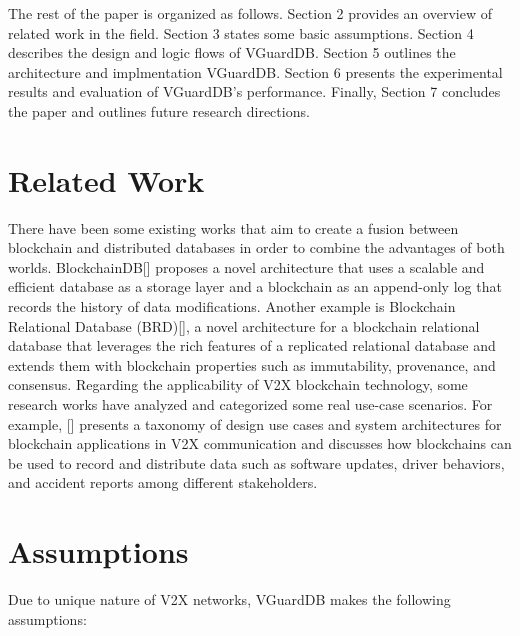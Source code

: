 The rest of the paper is organized as follows. Section 2 provides an overview of related work in the field. Section 3 states some basic assumptions. Section 4 describes the design and logic flows of VGuardDB. Section 5 outlines the architecture and implmentation VGuardDB. Section 6 presents the experimental results and evaluation of VGuardDB's performance. Finally, Section 7 concludes the paper and outlines future research directions.

\section{Related Work}
There have been some existing works that aim to create a fusion between blockchain and distributed databases in order to combine the advantages of both worlds. BlockchainDB[] proposes a novel architecture that uses a scalable and efficient database as a storage layer and a blockchain as an append-only log that records the history of data modifications. Another example is Blockchain Relational Database (BRD)[], a novel architecture for a blockchain relational database that leverages the rich features of a replicated relational database and extends them with blockchain properties such as immutability, provenance, and consensus.
Regarding the applicability of V2X blockchain technology, some research works have analyzed and categorized some real use-case scenarios. For example,  [] presents a taxonomy of design use cases and system architectures for blockchain applications in V2X communication and discusses how blockchains can be used to record and distribute data such as software updates, driver behaviors, and accident reports among different stakeholders. 

\section{Assumptions}
Due to unique nature of V2X networks, VGuardDB makes the following assumptions:

